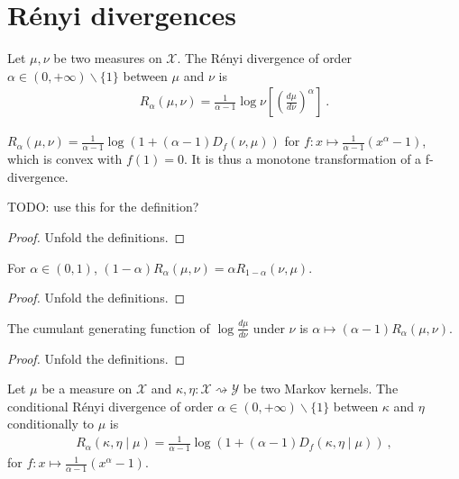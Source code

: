 \chapter{Rényi divergences}

\begin{definition}
  \label{def:Renyi}
  Let $\mu, \nu$ be two measures on $\mathcal X$. The Rényi divergence of order $\alpha \in (0,+\infty) \backslash \{1\}$ between $\mu$ and $\nu$ is
  \begin{align*}
  R_\alpha(\mu, \nu) = \frac{1}{\alpha - 1}\log \nu\left[\left(\frac{d \mu}{d \nu}\right)^\alpha\right] \: .
  \end{align*}
\end{definition}

\begin{lemma}
  \label{lem:renyi_eq_log_fDiv}
  $R_\alpha(\mu, \nu) = \frac{1}{\alpha - 1} \log (1 + (\alpha - 1) D_f(\nu, \mu))$ for $f : x \mapsto \frac{1}{\alpha - 1}(x^{\alpha} - 1)$, which is convex with $f(1)=0$. It is thus a monotone transformation of a f-divergence.

  TODO: use this for the definition?
\end{lemma}

\begin{proof}
Unfold the definitions.
\end{proof}

\begin{lemma}
  \label{lem:renyi_symm}
  For $\alpha \in (0, 1)$, $(1 - \alpha) R_\alpha(\mu, \nu) = \alpha R_{1 - \alpha}(\nu, \mu)$.
\end{lemma}

\begin{proof}
Unfold the definitions.
\end{proof}

\begin{lemma}
  \label{lem:renyi_cgf}
  The cumulant generating function of $\log\frac{d\mu}{d\nu}$ under $\nu$ is $\alpha \mapsto (\alpha - 1) R_\alpha(\mu, \nu)$.
\end{lemma}

\begin{proof}
Unfold the definitions.
\end{proof}

\begin{definition}
  \label{def:condRenyi}
  Let $\mu$ be a measure on $\mathcal X$ and $\kappa, \eta : \mathcal X \rightsquigarrow \mathcal Y$ be two Markov kernels. The conditional Rényi divergence of order $\alpha \in (0,+\infty) \backslash \{1\}$ between $\kappa$ and $\eta$ conditionally to $\mu$ is
  \begin{align*}
  R_\alpha(\kappa, \eta \mid \mu) =\frac{1}{\alpha - 1} \log (1 + (\alpha - 1) D_f(\kappa, \eta \mid \mu)) \: ,
  \end{align*}
  for $f : x \mapsto \frac{1}{\alpha - 1}(x^{\alpha} - 1)$.
\end{definition}

